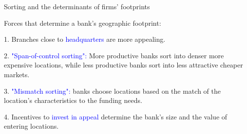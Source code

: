 \documentclass[notes,10pt, aspectratio=169]{beamer}
\newenvironment{wideitemize}{\itemize\addtolength{\itemsep}{10pt}}{\enditemize}
\begin{document}
\begin{frame}{Sorting and the determinants of firms' footprints}


      Forces that determine a bank's geographic footprint:
        \vspace{0.3cm}
        \begin{wideitemize}
            \item[1.] Branches close to \textcolor{blue}{headquarters} are more appealing.
            \item[2.] \textcolor{blue}{"Span-of-control sorting":} More productive banks sort into denser more expensive locations, while less productive banks sort into less attractive cheaper markets.
            \item[3.] \textcolor{blue}{"Mismatch sorting":} banks choose locations based on the match of the location's characteristics to the funding needs.
            \item[4.] Incentives to \textcolor{blue}{invest in appeal} determine the bank's size and the value of entering locations.
    \end{wideitemize}



\end{frame}
\end{document}
